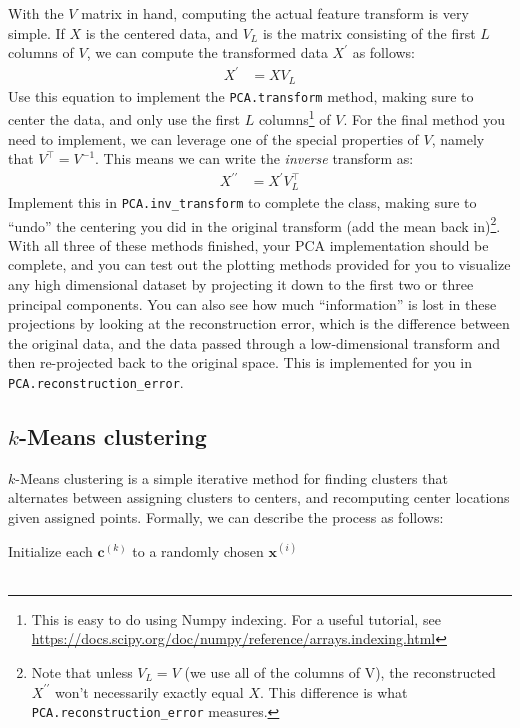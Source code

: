 \documentclass{article}
\begin{document}
With the \(V\) matrix in hand, computing the actual feature transform is very simple. If \(X\) is the centered data, and \(V_L\) is the matrix consisting of the first \(L\) columns of \(V\), we can compute the transformed data \(X^\prime\) as follows:
\begin{align*}
	X^\prime &= X V_L
\end{align*}
Use this equation to implement the \texttt{PCA.transform} method, making sure to center the data, and only use the first \(L\) columns\footnote{This is easy to do using Numpy indexing. For a useful tutorial, see \url{https://docs.scipy.org/doc/numpy/reference/arrays.indexing.html}} of \(V\). For the final method you need to implement, we can leverage one of the special properties of \(V\), namely that \(V^\top = V^{-1}\). This means we can write the \emph{inverse} transform as:
\begin{align*}
	X^{\prime\prime} &= X^\prime V_L^\top
\end{align*}
Implement this in \texttt{PCA.inv\_transform} to complete the class, making sure to ``undo'' the centering you did in the original transform (add the mean back in)\footnote{Note that unless \(V_L=V\) (we use all of the columns of V), the reconstructed \(X^{\prime\prime}\) won't necessarily exactly equal \(X\). This difference is what \texttt{PCA.reconstruction\_error} measures.}. With all three of these methods finished, your PCA implementation should be complete, and you can test out the plotting methods provided for you to visualize any high dimensional dataset by projecting it down to the first two or three principal components. You can also see how much ``information'' is lost in these projections by looking at the reconstruction error, which is the difference between the original data, and the data passed through a low-dimensional transform and then re-projected back to the original space. This is implemented for you in \texttt{PCA.reconstruction\_error}.

\subsection*{\(k\)-Means clustering}
\(k\)-Means clustering is a simple iterative method for finding clusters that alternates between assigning clusters to centers, and recomputing center locations given assigned points. Formally, we can describe the process as follows:

\begin{algorithm}[H]
	\SetAlgoLined
	Initialize each \(\mathbf{c}^{(k)}\) to a randomly chosen \(\mathbf{x}^{(i)}\)\\
	~
\end{algorithm}
\end{document}
